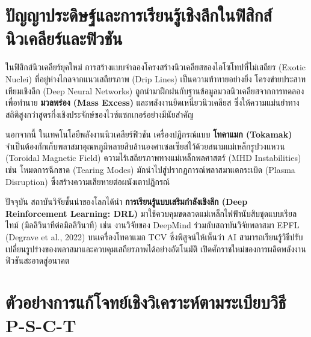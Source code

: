 \section{ปัญญาประดิษฐ์และการเรียนรู้เชิงลึกในฟิสิกส์นิวเคลียร์และฟิวชัน}

ในฟิสิกส์นิวเคลียร์ยุคใหม่ การสร้างแบบจำลองโครงสร้างนิวเคลียสของไอโซโทปที่ไม่เสถียร (Exotic Nuclei) ที่อยู่ห่างไกลจากแนวเสถียรภาพ (Drip Lines) เป็นความท้าทายอย่างยิ่ง โครงข่ายประสาทเทียมเชิงลึก (Deep Neural Networks) ถูกนำมาฝึกฝนกับฐานข้อมูลมวลนิวเคลียสจากการทดลอง เพื่อทำนาย \textbf{มวลพร่อง (Mass Excess)} และพลังงานยึดเหนี่ยวนิวเคลียส ซึ่งให้ความแม่นยำทางสถิติสูงกว่าสูตรกึ่งเชิงประจักษ์ของไวซ์แซกเกอร์อย่างมีนัยสำคัญ

นอกจากนี้ ในเทคโนโลยีพลังงานนิวเคลียร์ฟิวชัน เครื่องปฏิกรณ์แบบ \textbf{โทคาแมก (Tokamak)} จำเป็นต้องกักเก็บพลาสมาอุณหภูมิหลายสิบล้านองศาเซลเซียสไว้ด้วยสนามแม่เหล็กรูปวงแหวน (Toroidal Magnetic Field) ความไร้เสถียรภาพทางแม่เหล็กพลศาสตร์ (MHD Instabilities) เช่น โหมดการฉีกขาด (Tearing Modes) มักนำไปสู่ปรากฏการณ์พลาสมาแตกระเบิด (Plasma Disruption) ซึ่งสร้างความเสียหายต่อผนังเตาปฏิกรณ์

ปัจจุบัน สถาบันวิจัยชั้นนำของโลกได้นำ \textbf{การเรียนรู้แบบเสริมกำลังเชิงลึก (Deep Reinforcement Learning: DRL)} มาใช้ควบคุมขดลวดแม่เหล็กไฟฟ้านับสิบชุดแบบเรียลไทม์ (มิลลิวินาทีต่อมิลลิวินาที) เช่น งานวิจัยของ DeepMind ร่วมกับสถาบันวิจัยพลาสมา EPFL (Degrave et al., 2022) บนเครื่องโทคาแมก TCV ซึ่งพิสูจน์ให้เห็นว่า AI สามารถเรียนรู้วิธีปรับเปลี่ยนรูปร่างของพลาสมาและควบคุมเสถียรภาพได้อย่างอัตโนมัติ เปิดศักราชใหม่ของการผลิตพลังงานฟิวชันสะอาดสู่อนาคต

\section{ตัวอย่างการแก้โจทย์เชิงวิเคราะห์ตามระเบียบวิธี P-S-C-T}


